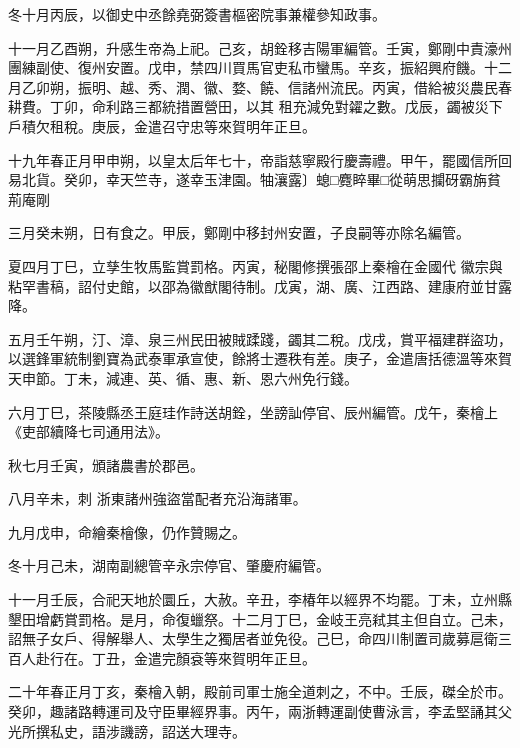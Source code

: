 \begin{pinyinscope}
 冬十月丙辰，以御史中丞餘堯弼簽書樞密院事兼權參知政事。



 十一月乙酉朔，升感生帝為上祀。己亥，胡銓移吉陽軍編管。壬寅，鄭剛中責濠州團練副使、復州安置。戊申，禁四川買馬官吏私市蠻馬。辛亥，振紹興府饑。十二月乙卯朔，振明、越、秀、潤、徽、婺、饒、信諸州流民。丙寅，借給被災農民春耕費。丁卯，命利路三都統措置營田，以其
 租充減免對糴之數。戊辰，蠲被災下戶積欠租稅。庚辰，金遣召守忠等來賀明年正旦。



 十九年春正月甲申朔，以皇太后年七十，帝詣慈寧殿行慶壽禮。甲午，罷國信所回易北貨。癸卯，幸天竺寺，遂幸玉津園。牰瀼露〕螅□麑睟畢□從萌思攔砑霸旃貧荊庵剛



 三月癸未朔，日有食之。甲辰，鄭剛中移封州安置，子良嗣等亦除名編管。



 夏四月丁巳，立孳生牧馬監賞罰格。丙寅，秘閣修撰張邵上秦檜在金國代
 徽宗與粘罕書稿，詔付史館，以邵為徽猷閣待制。戊寅，湖、廣、江西路、建康府並甘露降。



 五月壬午朔，汀、漳、泉三州民田被賊蹂踐，蠲其二稅。戊戌，賞平福建群盜功，以選鋒軍統制劉寶為武泰軍承宣使，餘將士遷秩有差。庚子，金遣唐括德溫等來賀天申節。丁未，減連、英、循、惠、新、恩六州免行錢。



 六月丁巳，茶陵縣丞王庭珪作詩送胡銓，坐謗訕停官、辰州編管。戊午，秦檜上《吏部續降七司通用法》。



 秋七月壬寅，頒諸農書於郡邑。



 八月辛未，刺
 浙東諸州強盜當配者充沿海諸軍。



 九月戊申，命繪秦檜像，仍作贊賜之。



 冬十月己未，湖南副總管辛永宗停官、肇慶府編管。



 十一月壬辰，合祀天地於圜丘，大赦。辛丑，李椿年以經界不均罷。丁未，立州縣墾田增虧賞罰格。是月，命復蠟祭。十二月丁巳，金岐王亮弒其主但自立。己未，詔無子女戶、得解舉人、太學生之獨居者並免役。己巳，命四川制置司歲募扈衛三百人赴行在。丁丑，金遣完顏袞等來賀明年正旦。



 二十年春正月丁亥，秦檜入朝，殿前司軍士施全道刺之，不中。壬辰，磔全於市。癸卯，趣諸路轉運司及守臣畢經界事。丙午，兩浙轉運副使曹泳言，李孟堅誦其父光所撰私史，語涉譏謗，詔送大理寺。




\end{pinyinscope}
